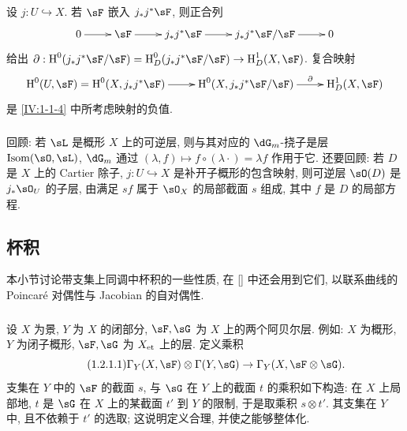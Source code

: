 \subsubsection{}\label{IV:1-1-5}

设 $j:U\hookrightarrow X$. 若 $\sF$ 嵌入 $j_* j^* \sF$, 则正合列
\[\xymatrix{
  0 \ar[r]
  & \sF \ar[r]
  & j_* j^* \sF \ar[r]
  & j_* j^* \sF / \sF \ar[r]
  & 0
}\]
给出
$\partial:\h^0(j_* j^*\sF/\sF) = \h_D^0(j_* j^* \sF/\sF) \to \h_D^1(X,\sF)$.
复合映射
\[\xymatrix{
  \h^0(U,\sF) = \h^0(X,j_* j^*\sF) \ar[r]
    & \h^0(X,j_* j^*\sF / \sF) \ar[r]^-\partial
    & \h_D^1(X,\sF)
}\]
是 \ref{IV:1-1-4} 中所考虑映射的负值.

\subsubsection{}\label{IV:1-1-6}

回顾: 若 $\sL$ 是概形 $X$ 上的可逆层, 则与其对应的 $\dG_m$-挠子是层
$\operatorname{Isom}(\sO,\sL)$, $\dG_m$ 通过
$(\lambda,f)\mapsto f\circ (\lambda\cdot) = \lambda f$ 作用于它.
还要回顾: 若 $D$ 是 $X$ 上的 Cartier 除子, $j:U\hookrightarrow X$ 是补开子概形的包含映射,
则可逆层 $\sO(D)$ 是 $j_*\sO_U$ 的子层, 由满足 $s f$ 属于 $\sO_X$ 的局部截面 $s$ 组成,
其中 $f$ 是 $D$ 的局部方程.

\subsection{杯积}\label{IV:1-2}

本小节讨论带支集上同调中杯积的一些性质, 在 [] 中还会用到它们,
以联系曲线的 Poincaré 对偶性与 Jacobian 的自对偶性.

\subsubsection{}\label{IV:1-2-1}

设 $X$ 为景, $Y$ 为 $X$ 的闭部分, $\sF,\sG$ 为 $X$ 上的两个阿贝尔层.
例如: $X$ 为概形, $Y$ 为闭子概形, $\sF,\sG$ 为 ${X}_{\textnormal{et}}$ 上的层. 定义乘积
\begin{equation*}\tag{1.2.1.1}\label{IV:eq:1-2-1-1}
  \Gamma_Y(X,\sF)\otimes \Gamma(Y,\sG) \to \Gamma_Y(X,\sF\otimes\sG) \text{.}
\end{equation*}
支集在 $Y$ 中的 $\sF$ 的截面 $s$, 与 $\sG$ 在 $Y$ 上的截面 $t$ 的乘积如下构造:
在 $X$ 上局部地, $t$ 是 $\sG$ 在 $X$ 上的某截面 $t'$ 到 $Y$ 的限制, 于是取乘积 $s\otimes t'$.
其支集在 $Y$ 中, 且不依赖于 $t'$ 的选取; 这说明定义合理, 并使之能够整体化.

